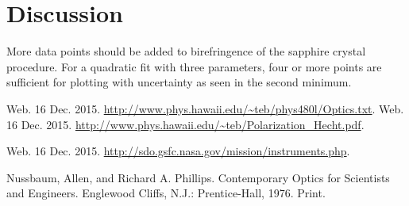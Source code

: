 \documentclass[aps,prl,twocolumn,superscriptaddress,nofootinbib]{revtex4-1}
\begin{document}
\section{Discussion}

More data points should be added to birefringence of the sapphire crystal procedure. For a quadratic fit with three parameters, four or more points are sufficient for plotting with uncertainty as seen in the second minimum. 


\setlength{\parindent}{0cm}

\begin{thebibliography}{99}  %

 Web. 16 Dec. 2015. \url{http://www.phys.hawaii.edu/~teb/phys480l/Optics.txt}.     %
 Web. 16 Dec. 2015. \url{http://www.phys.hawaii.edu/~teb/Polarization_Hecht.pdf}.

 Web. 16 Dec. 2015. \url{http://sdo.gsfc.nasa.gov/mission/instruments.php}.

 Nussbaum, Allen, and Richard A. Phillips. Contemporary Optics for Scientists and Engineers. Englewood Cliffs, N.J.: Prentice-Hall, 1976. Print.



\end{thebibliography}
\end{document}
